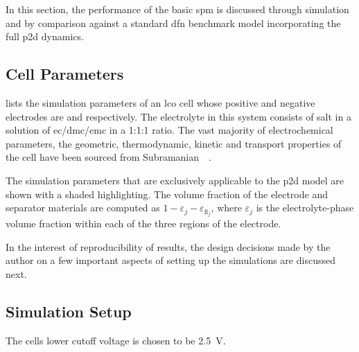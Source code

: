 
In this  section, the performance  of the  basic \gls{spm} is  discussed through
simulation  and  by comparison  against  a  standard \gls{dfn}  benchmark  model
incorporating the full \gls{p2d} dynamics.

\subsection{Cell Parameters}


 lists  the simulation  parameters of  an \gls{lco}
cell  whose positive  and negative  electrodes are   and  
respectively.  The  electrolyte in  this  system  consists of    salt
in  a  solution of  \gls{ec}/\gls{dmc}/\gls{emc}  in  a  1:1:1 ratio.  The  vast
majority  of electrochemical  parameters, \viz{}  the geometric,  thermodynamic,
kinetic  and   transport  properties  of   the  cell  have  been   sourced  from
Subramanian~\etal{}~\cite{Subramanian2009}.

The simulation parameters that are exclusively applicable to the \gls{p2d}
model are shown with a shaded highlighting.
The volume fraction of the electrode  and separator materials are computed as $1
-  \varepsilon_j  -  \varepsilon_{\text{fi}_j}$, where  $\varepsilon_j$  is  the
electrolyte-phase  volume fraction  within  each  of the  three  regions of  the
electrode.


In the interest of reproducibility of  results, the design decisions made by the
author on  a few important aspects  of setting up the  simulations are discussed
next.

\subsection{Simulation Setup}

The cells lower cutoff voltage is chosen to be \SI{2.5}{V}.
